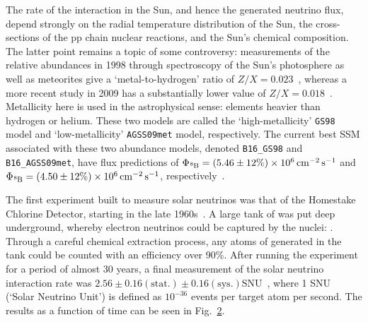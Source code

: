 \begin{figure}
    \centering
    \caption[]{}
    \label{fig:ssm_neutrino_spectra}
\end{figure}

The rate of the \beight{} interaction in the Sun, and hence the generated neutrino flux, depend strongly on the radial temperature distribution of the Sun, the cross-sections of the pp chain nuclear reactions, and the Sun's chemical composition. The latter point remains a topic of some controversy: measurements of the relative abundances in 1998 through spectroscopy of the Sun's photosphere as well as meteorites give a `metal-to-hydrogen' ratio of $Z/X = 0.023$~\cite{grevesseStandardSolarComposition1998}, whereas a more recent study in 2009 has a substantially lower value of $Z/X = 0.018$~\cite{asplundChemicalCompositionSun2009}. Metallicity here is used in the astrophysical sense: elements heavier than hydrogen or helium. These two models are called the `high-metallicity' \texttt{GS98} model and `low-metallicity' \texttt{AGSS09met} model, respectively. The current best SSM associated with these two abundance models, denoted \texttt{B16\_GS98} and \texttt{B16\_AGSS09met}, have \beight{} flux predictions of $\Phi_{\beight{}} = (5.46\pm12\%)\times 10^{6}\,\si{\per\cm\squared\per\second}$ and $\Phi_{\beight{}} = (4.50\pm12\%)\times 10^{6}\,\si{\per\cm\squared\per\second}$, respectively~\cite{vinyolesB16StandardSolar2018}.

The first experiment built to measure solar neutrinos was that of the Homestake Chlorine Detector, starting in the late 1960s~\cite{davisSearchNeutrinosSun1968}. A large tank of  was put deep underground, whereby electron neutrinos could be captured by the  nuclei: . Through a careful chemical extraction process, any atoms of  generated in the tank could be counted with an efficiency over 90\%. After running the experiment for a period of almost 30 years, a final measurement of the solar neutrino interaction rate was $2.56\pm0.16(\mathrm{stat.})\pm0.16(\mathrm{sys.})\mathrm{ SNU}$~\cite{clevelandMeasurementSolarElectron1998}, %
where 1 SNU (`Solar Neutrino Unit') is defined as $10^{-36}$ events per target atom per second. The results as a function of time can be seen in Fig.~\ref{fig:homestake_results}.

\begin{figure}
    \centering
    \caption[]{}
    \label{fig:homestake_results}
\end{figure}

